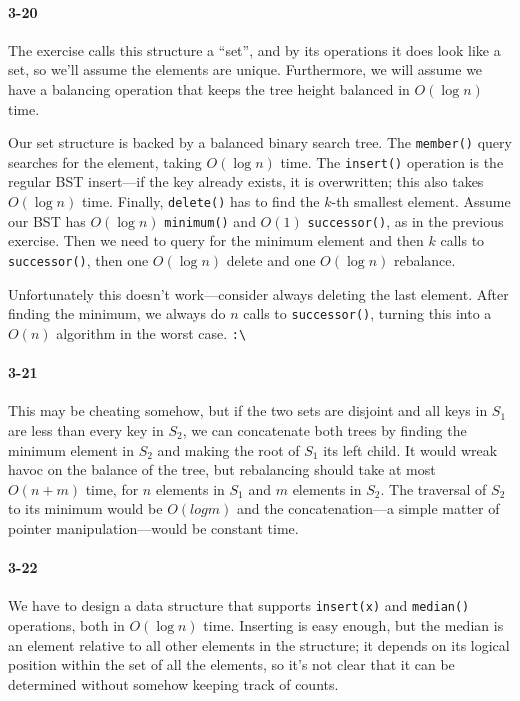 \documentclass{report}
\begin{document}
\paragraph{3-20} The exercise calls this structure a ``set'', and by its operations it
does look like a set, so we'll assume the elements are unique. Furthermore, we will assume
we have a balancing operation that keeps the tree height balanced in $O(\log n)$ time.

Our set structure is backed by a balanced binary search tree. The \lstinline!member()!
query searches for the element, taking $O(\log n)$ time. The \lstinline!insert()!
operation is the regular BST insert---if the key already exists, it is overwritten; this
also takes $O(\log n)$ time. Finally, \lstinline!delete()! has to find the $k$-th smallest
element. Assume our BST has $O(\log n)$ \lstinline!minimum()! and $O(1)$ \lstinline!successor()!,
as in the previous exercise. Then we need to query for the minimum element and then $k$
calls to \lstinline!successor()!, then one $O(\log n)$ delete and one $O(\log n)$
rebalance.

Unfortunately this doesn't work---consider always deleting the last element. After finding
the minimum, we always do $n$ calls to \lstinline!successor()!, turning this into a $O(n)$
algorithm in the worst case. \lstinline!:\!

\paragraph{3-21} This may be cheating somehow, but if the two sets are disjoint and all
keys in $S_1$ are less than every key in $S_2$, we can concatenate both trees by finding
the minimum element in $S_2$ and making the root of $S_1$ its left child. It would wreak
havoc on the balance of the tree, but rebalancing should take at most $O(n+m)$ time, for
$n$ elements in $S_1$ and $m$ elements in $S_2$. The traversal of $S_2$ to its
minimum would be $O(log m)$ and the concatenation---a simple matter of pointer
manipulation---would be constant time.

\paragraph{3-22} We have to design a data structure that supports \lstinline!insert(x)!
and \lstinline!median()! operations, both in $O(\log n)$ time. Inserting is easy enough,
but the median is an element relative to all other elements in the structure; it depends
on its logical position within the set of all the elements, so it's not clear that it
can be determined without somehow keeping track of counts.
\end{document}
